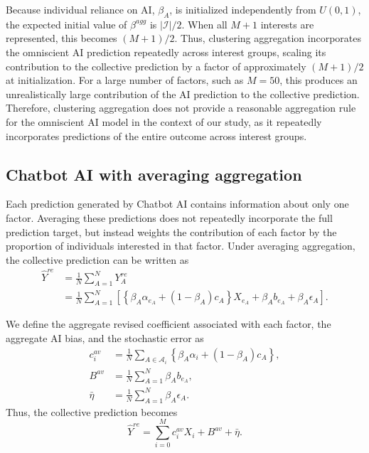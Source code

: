 \documentclass[12pt]{article}
\begin{document}
Because individual reliance on AI, $\beta_A$, is initialized independently from $U(0,1)$, the expected initial value of $\beta^{agg}$ is $|\mathcal{I}|/2$. When all $M+1$ interests are represented, this becomes $(M+1)/2$.
Thus, clustering aggregation incorporates the omniscient AI prediction repeatedly across interest groups, scaling its contribution to the collective prediction by a factor of approximately $(M+1)/2$ at initialization.
For a large number of factors, such as \(M=50\), this produces an unrealistically large contribution of the AI prediction to the collective prediction.
Therefore, clustering aggregation does not provide a reasonable aggregation rule for the omniscient AI model in the context of our study, as it repeatedly incorporates predictions of the entire outcome across interest groups.

\subsection*{Chatbot AI with averaging aggregation}

Each prediction generated by Chatbot AI contains information about only one factor. 
Averaging these predictions does not repeatedly incorporate the full prediction target, but instead weights the contribution of each factor by the proportion of individuals interested in that factor. 
Under averaging aggregation, the collective prediction can be written as
\begin{align}
\hat{Y}^{re}
&= \frac{1}{N}\sum_{A=1}^{N}Y_A^{re}\\
&= \frac{1}{N}\sum_{A=1}^{N}
\left[\left\{\beta_A\alpha_{e_A}+(1-\beta_A)c_A\right\}X_{e_A} + \beta_Ab_{e_A}+\beta_A\epsilon_A\right].
\end{align}

We define the aggregate revised coefficient associated with each factor, the aggregate AI bias, and the stochastic error as
\begin{align}
c_i^{av}
&= \frac{1}{N}\sum_{A\in\mathcal{A}_i}
\left\{\beta_A\alpha_i+(1-\beta_A)c_A\right\},\\
B^{av}
&= \frac{1}{N}\sum_{A=1}^{N}\beta_Ab_{e_A},\\
\bar{\eta}
&= \frac{1}{N}\sum_{A=1}^{N}\beta_A\epsilon_A.
\end{align}
Thus, the collective prediction becomes
\begin{equation}
\hat{Y}^{re}
= \sum_{i=0}^{M}c_i^{av}X_i+B^{av}+\bar{\eta}.
\end{equation}
\end{document}
